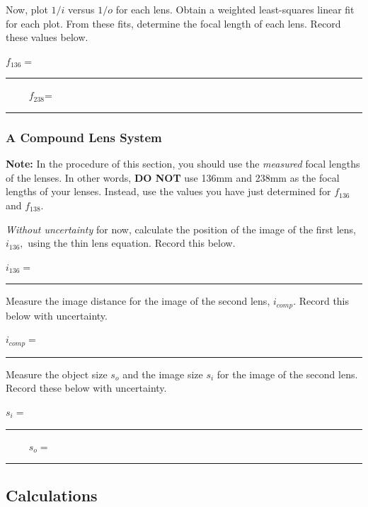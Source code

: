 \noindent
Now, plot $1/i$ versus $1/o$ for each lens. Obtain a weighted least-squares
linear fit for each plot. From these fits, determine the focal length of each lens.
Record these values below.

\begin{center}
$f_{136}=$~ \rule{3cm}{.1mm}~~~~
$f_{238}$=~ \rule{3cm}{.1mm} 
\end{center}

\newpage

\subsubsection{A Compound Lens System}

{\bf Note:} In the procedure of this section, you should use the {\it measured}
focal lengths of the lenses. In other words, {\bf DO NOT} use 136mm and 238mm
as the focal lengths of your lenses. Instead, use the values you have just
determined for $f_{136}$ and $f_{138}.$
\vspace*{.5cm}

\noindent
{\it Without uncertainty} for now,  calculate the position of the image of the first
lens, $i_{136},$ using the thin lens equation. Record this below.

\begin{center}
$i_{136}=$~\rule{3cm}{.1mm}
\end{center}
\vspace*{.5cm}

\noindent
Measure the image distance for the image of the second lens, $i_{comp}.$
Record this below with uncertainty.

\begin{center}
$i_{comp}=$~\rule{3cm}{.1mm}

\end{center}
\vspace*{.5cm}

\noindent
Measure the object size $s_o$ and the image size $s_i$ for the image of the 
second lens. Record these below with uncertainty.

\begin{center}
$s_i=$~\rule{3cm}{.1mm} ~~~~
$s_o=$~\rule{3cm}{.1mm}
\end{center}

\newpage

\subsection{Calculations}

